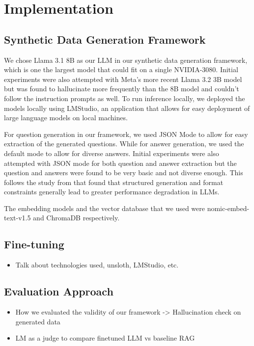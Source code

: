 \section{Implementation}\label{sec:implementation}


\subsection{Synthetic Data Generation Framework}

We chose Llama 3.1 8B as our LLM in our synthetic data generation framework, which is one the largest model that could fit on a single NVIDIA-3080. Initial experiments
were also attempted with Meta's more recent Llama 3.2 3B model but was found to hallucinate more frequently than the 8B model and couldn't follow the instruction prompts as well.
To run inference locally, we deployed the models locally using LMStudio, an application that allows for easy deployment of large language models on local machines.

For question generation in our framework, we used JSON Mode to allow for easy extraction of the generated questions. While for answer generation, we used the default
mode to allow for diverse answers. Initial experiments were also attempted with JSON mode for both question and answer extraction but the question and answers
were found to be very basic and not diverse enough. This follows the study from \cite{tam2024letspeakfreelystudy} that found that structured generation and format constraints
generally lead to greater performance degradation in LLMs.

The embedding models and the vector database that we used were nomic-embed-text-v1.5 and ChromaDB respectively.

\subsection{Fine-tuning}

\begin{itemize}
    \item Talk about technologies used, unsloth, LMStudio, etc.
\end{itemize}

\subsection{Evaluation Approach}
\begin{itemize}
\item How we evaluated the validity of our framework -> Hallucination check on generated data
\item LM as a judge to compare finetuned LLM vs baseline RAG
\end{itemize}

